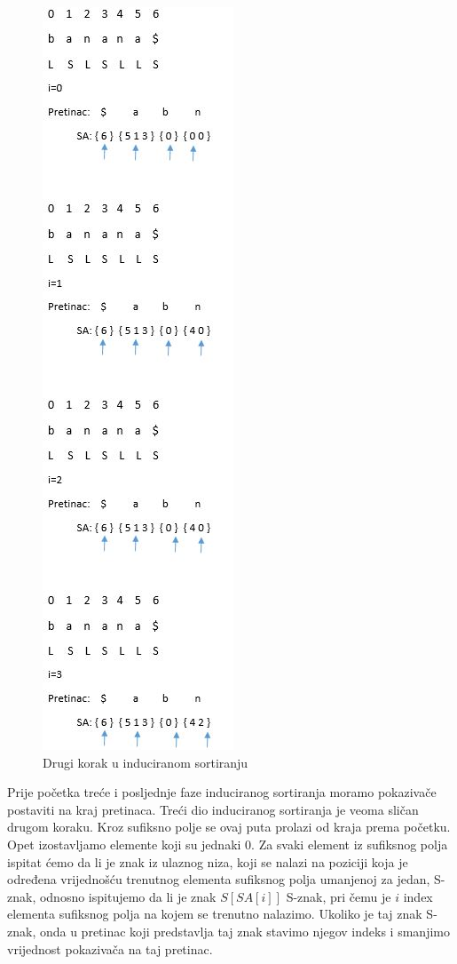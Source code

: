 \begin{figure}[H]
   \centering
       \includegraphics{./pictures/SAISstep2.jpg}
 \caption{Drugi korak u induciranom sortiranju}
 \label{fig:sais2}
\end{figure}

Prije početka treće i posljednje faze induciranog sortiranja moramo pokazivače postaviti na kraj pretinaca. Treći dio induciranog sortiranja je veoma sličan drugom koraku. Kroz sufiksno polje se ovaj puta prolazi od kraja prema početku. Opet izostavljamo elemente koji su jednaki 0.  Za svaki element iz sufiksnog polja ispitat ćemo da li je znak iz ulaznog niza, koji se nalazi na poziciji koja je određena vrijednošću trenutnog elementa sufiksnog polja umanjenoj za jedan, S-znak, odnosno ispitujemo da li je znak $S[SA[i]]$ S-znak, pri čemu je $i$ index elementa sufiksnog polja na kojem se trenutno nalazimo. Ukoliko je taj znak S-znak, onda u pretinac koji predstavlja taj znak stavimo njegov indeks i smanjimo vrijednost pokazivača na taj pretinac. 

